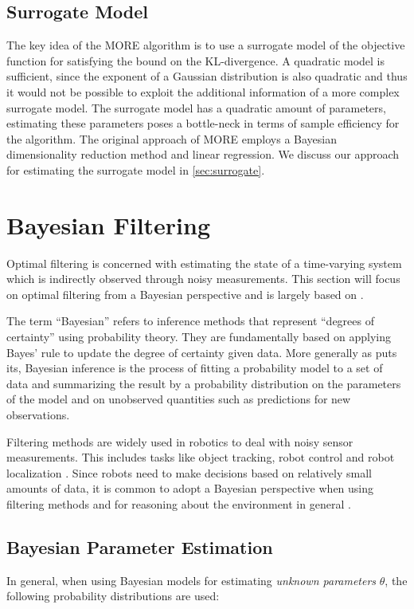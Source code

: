 \subsection{Surrogate Model}
The key idea of the MORE algorithm is to use a surrogate model
of the objective function
for satisfying the bound on the KL-divergence.
A quadratic model is sufficient, since the exponent
of a Gaussian distribution
is also quadratic and thus it would not be possible to exploit
the additional information of a more complex surrogate model.
The surrogate model has a quadratic amount of parameters,
estimating these parameters poses a
bottle-neck in terms of sample efficiency for the algorithm.
The original approach of MORE employs a Bayesian dimensionality
reduction method and linear regression. We discuss our approach
for estimating the surrogate model in \cref{sec:surrogate}.


\section{Bayesian Filtering}
Optimal filtering is concerned with estimating the state
of a time-varying system
which is indirectly observed through noisy measurements.
This section will focus on optimal filtering from a Bayesian perspective
and is largely based on \citet{sarkka2013bayesian}.

The term ``Bayesian'' refers to inference methods that represent
``degrees of certainty'' using probability theory. They are fundamentally
based on applying
Bayes' rule to update the degree of certainty given data.
More generally as \citet{gelman2013bayesian} puts its, Bayesian inference
is the process of fitting a probability model
to a set of data and summarizing the result by a probability distribution
on the parameters of the model and on unobserved quantities such
as predictions for new observations.

Filtering methods are widely used in robotics
to deal with noisy sensor measurements. This
includes tasks like object tracking, robot control and
robot localization \citep{chen2011kalman}.
Since robots need to make decisions based on relatively small amounts
of data, it is common to adopt a Bayesian perspective when
using filtering methods and for 
reasoning about the environment in general \citep{thrun2002probabilistic}.

\subsection{Bayesian Parameter Estimation}
In general, when using Bayesian models for estimating
\textit{unknown parameters} $\theta$, the following probability distributions
are used:

